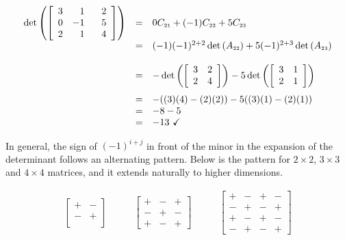 \documentclass{ximera}
\begin{document}
\[ \begin{array}{rcl} 

\det \left( \left[ \begin{array}{rrr} 3 & 1 & \hphantom{-}2 \\ 0 & -1 & 5 \\ 2 & 1 & 4 \\ \end{array} \right] \right)& = & 0C_{\mbox{\tiny$21$}} + (-1)C_{\mbox{\tiny$22$}}+5C_{\mbox{\tiny$23$}} \\

& = &  (-1) (-1)^{2+2} \det\left(A_{\mbox{\tiny$22$}}\right) + 5 (-1)^{2+3}\det\left(A_{\mbox{\tiny$23$}}\right) \\[13pt]
        
        & = & - \det \left( \left[ \begin{array}{rr} 3 & 2 \\ 2 & 4 \\ \end{array} \right] \right) -5 \det \left( \left[ \begin{array}{rr} 3 & 1 \\ 2 & 1 \\ \end{array} \right] \right) \\[13pt]
        & = & -((3)(4)-(2)(2)) - 5((3)(1)-(2)(1)) \\
        & = & -8-5 \\
        & = & -13 \, \, \checkmark \\ \end{array}  \]

In general, the sign of $(-1)^{i+j}$ in front of the minor in the expansion of the determinant follows an alternating pattern. Below is the pattern for $2 \times 2$, $3 \times 3$ and $4 \times 4$ matrices, and it extends naturally to higher dimensions.  

\[ \begin{array}{ccc}

\left[ \begin{array}{cc} + & - \\ - & + \\ \end{array} \right] 

&
\qquad 

\left[ \begin{array}{ccc} + & - & + \\ - & + & - \\ + & - & +  \end{array} \right] 


&

\qquad

\left[ \begin{array}{cccc} + & - & + & - \\ - & + & - & +\\ + & - & + & - \\ - & + & - & + \end{array} \right] 

\end{array} \]
\end{document}
